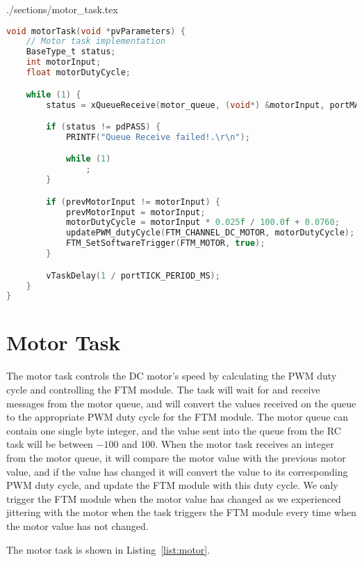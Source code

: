 \begin{filecontents}[overwrite]{./sections/motor_task.tex}
\begin{lstlisting}[language=c,caption=Motor Task, label=list:motor]
void motorTask(void *pvParameters) {
    // Motor task implementation
    BaseType_t status;
    int motorInput;
    float motorDutyCycle;

    while (1) {
        status = xQueueReceive(motor_queue, (void*) &motorInput, portMAX_DELAY);

        if (status != pdPASS) {
            PRINTF("Queue Receive failed!.\r\n");

            while (1)
                ;
        }

        if (prevMotorInput != motorInput) {
            prevMotorInput = motorInput;
            motorDutyCycle = motorInput * 0.025f / 100.0f + 0.0760;
            updatePWM_dutyCycle(FTM_CHANNEL_DC_MOTOR, motorDutyCycle);
            FTM_SetSoftwareTrigger(FTM_MOTOR, true);
        }

        vTaskDelay(1 / portTICK_PERIOD_MS);
    }
}
\end{lstlisting}
\end{filecontents}

\section*{Motor Task}

The motor task controls the DC motor's speed by calculating the PWM duty cycle and controlling the FTM module. The task will wait for and receive messages from the motor queue, and will convert the values received on the queue to the appropriate PWM duty cycle for the FTM module. The motor queue can contain one single byte integer, and the value sent into the queue from the RC task will be between $-100$ and $100$. When the motor task receives an integer from the motor queue, it will compare the motor value with the previous motor value, and if the value has changed it will convert the value to its corresponding PWM duty cycle, and update the FTM module with this duty cycle. We only trigger the FTM module when the motor value has changed as we experienced jittering with the motor when the task triggers the FTM module every time when the motor value has not changed.

The motor task is shown in Listing~\ref{list:motor}.

